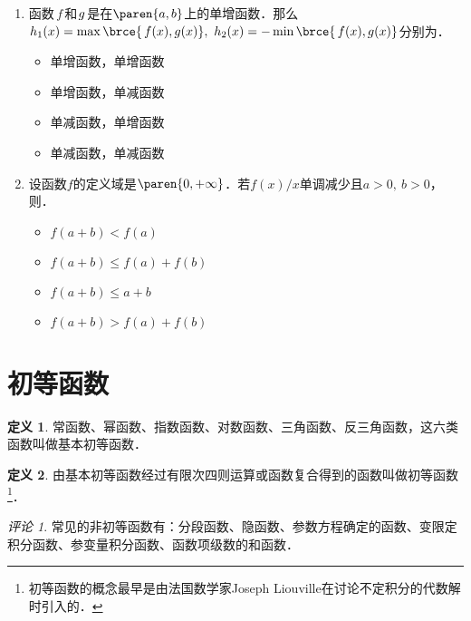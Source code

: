 \documentclass[a4paper,punct=CCT]{ctexbook}
\theoremstyle{definition}
\newtheorem*{definition*}{定义}
\theoremstyle{remark}
\newtheorem*{remark}{评论}
\newif\ifshowsol
\let\leq\leqslant
\let\le\leq
\begin{document}
\begin{enumerate}
\item 函数\(\,f\,\)和\(\mkern2mu g\mkern1mu\)是在\(\paren{a,b}\)上的单增函数．那么\(h_1(x) = \max\brce{\,f(x), g(x)},\ h_2(x) = -\min\brce{\,f(x), g(x)}\)分别为\uline{\makebox[6em]{}}．
  \begin{itemize}
    \renewcommand{\labelitemi}{\faCircleThin}
  \item 单增函数，单增函数
    \ifshowsol
  \item[\faCircle] 单增函数，单减函数
    \else
  \item 单增函数，单减函数
    \fi
  \item 单减函数，单增函数
  \item 单减函数，单减函数
  \end{itemize}

\item 设函数\(f\)的定义域是\(\paren{0,+\infty}\)．若\(f(x)/x\)单调减少且\(a > 0,\ b > 0\)，则\uline{\makebox[6em]{}}．
  \begin{itemize}
    \renewcommand{\labelitemi}{\faCircleThin}
  \item \(f(a+b) < f(a)\)
    \ifshowsol
  \item[\faCircle] \(f(a+b) \le f(a) + f(b)\)
    \else
  \item \(f(a+b) \le f(a) + f(b)\)
    \fi
  \item \(f(a+b) \le a + b\)
  \item \(f(a+b) > f(a) + f(b)\)
  \end{itemize}
\end{enumerate}
\fi

\section{初等函数}

\begin{definition*}
  常函数、幂函数、指数函数、对数函数、三角函数、反三角函数，这六类函数叫做基本初等函数．
\end{definition*}

\begin{definition*}
  由基本初等函数经过有限次四则运算或函数复合得到的函数叫做初等函数\footnote{初等函数的概念最早是由法国数学家Joseph Liouville在讨论不定积分的代数解时引入的．}．
\end{definition*}

\begin{remark}
  常见的非初等函数有：分段函数、隐函数、参数方程确定的函数、变限定积分函数、参变量积分函数、函数项级数的和函数．
\end{remark}
\end{document}
